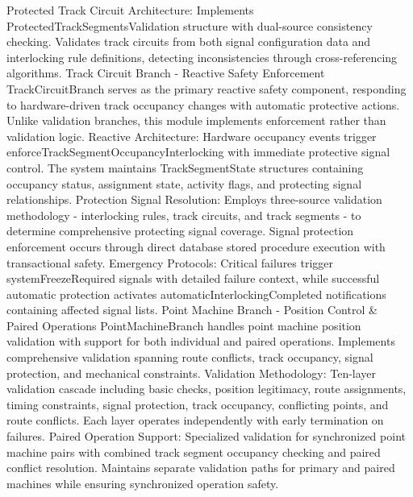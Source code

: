 Protected Track Circuit Architecture: Implements ProtectedTrackSegmentsValidation structure with dual-source consistency checking. Validates track circuits from both signal configuration data and interlocking rule definitions, detecting inconsistencies through cross-referencing algorithms.
Track Circuit Branch - Reactive Safety Enforcement
TrackCircuitBranch serves as the primary reactive safety component, responding to hardware-driven track occupancy changes with automatic protective actions. Unlike validation branches, this module implements enforcement rather than validation logic.
Reactive Architecture: Hardware occupancy events trigger enforceTrackSegmentOccupancyInterlocking with immediate protective signal control. The system maintains TrackSegmentState structures containing occupancy status, assignment state, activity flags, and protecting signal relationships.
Protection Signal Resolution: Employs three-source validation methodology - interlocking rules, track circuits, and track segments - to determine comprehensive protecting signal coverage. Signal protection enforcement occurs through direct database stored procedure execution with transactional safety.
Emergency Protocols: Critical failures trigger systemFreezeRequired signals with detailed failure context, while successful automatic protection activates automaticInterlockingCompleted notifications containing affected signal lists.
Point Machine Branch - Position Control & Paired Operations
PointMachineBranch handles point machine position validation with support for both individual and paired operations. Implements comprehensive validation spanning route conflicts, track occupancy, signal protection, and mechanical constraints.
Validation Methodology: Ten-layer validation cascade including basic checks, position legitimacy, route assignments, timing constraints, signal protection, track occupancy, conflicting points, and route conflicts. Each layer operates independently with early termination on failures.
Paired Operation Support: Specialized validation for synchronized point machine pairs with combined track segment occupancy checking and paired conflict resolution. Maintains separate validation paths for primary and paired machines while ensuring synchronized operation safety.